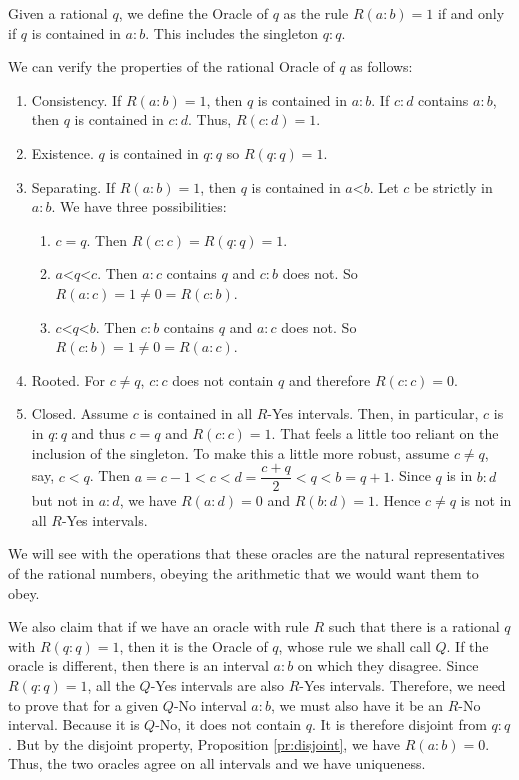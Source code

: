 \documentclass[12pt]{article}
\theoremstyle{remark}
\newcommand{\lt}{\mathord{<}}
\begin{document}
Given a rational $q$, we define the Oracle of $q$ as the rule $R(a:b) = 1$ if and only if $q$ is contained in $a:b$. This includes the singleton $q:q$.  



We can verify the properties of the rational Oracle of $q$ as follows: 

\begin{enumerate}
    \item Consistency. If $R(a:b)=1$, then $q$ is contained in $a:b$. If $c:d$ contains $a:b$, then $q$ is contained in $c:d$. Thus, $R(c:d)=1$.
    \item Existence. $q$ is contained in $q:q$ so $R(q:q)=1$.
    \item Separating. If $R(a:b) =1$, then $q$ is contained in $a\lt b$. Let $c$ be strictly in $a:b$. We have three possibilities: 
    \begin{enumerate}
    \item $c=q$. Then $R(c:c) = R(q:q) = 1$.
    \item $a \lt q \lt c$. Then $a:c$ contains $q$ and $c:b$ does not. So $R(a:c)=1 \neq 0 =R(c:b)$.
    \item $c \lt q \lt b$. Then $c:b$ contains $q$ and $a:c$ does not. So $R(c:b)=1 \neq 0 =R(a:c)$.
    \end{enumerate}    
    \item Rooted. For $c \neq q$, $c:c$ does not contain $q$ and therefore $R(c:c)=0$.
    \item Closed. Assume $c$ is contained in all $R$-Yes intervals. Then, in particular, $c$ is in $q:q$ and thus $c=q$ and $R(c:c)=1$. That feels a little too reliant on the inclusion of the singleton. To make this a little more robust, assume $c \neq q$, say, $c < q$. Then  $a=c-1 < c < d=\dfrac{c+q}{2} < q < b=q+1$. Since $q$ is in $b:d$ but not in $a:d$, we have $R(a:d)=0$ and $R(b:d)=1$. Hence $c \neq q$ is not in all $R$-Yes intervals.
\end{enumerate}

We will see with the operations that these oracles are the natural representatives of the rational numbers, obeying the arithmetic that we would want them to obey.  

We also claim that if we have an oracle with rule $R$ such that there is a rational $q$ with $R(q:q)=1$, then it is the Oracle of $q$, whose rule we shall call $Q$. If the oracle is different, then there is an interval $a:b$ on which they disagree. Since $R(q:q) =1$, all the  $Q$-Yes intervals are also $R$-Yes intervals. Therefore, we need to prove that for a given  $Q$-No interval $a:b$, we must also have it be an $R$-No interval. Because it is $Q$-No, it does not contain $q$. It is therefore disjoint from $q:q$. But by the disjoint property, Proposition \ref{pr:disjoint}, we have $R(a:b)=0$. Thus, the two oracles agree on all intervals and we have uniqueness. 
\end{document}
